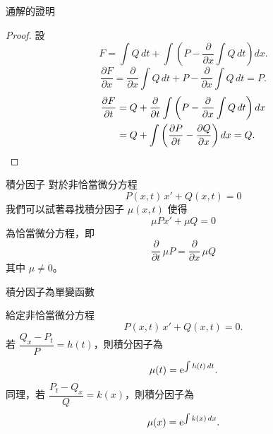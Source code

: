 \documentclass{beamer}
\newcommand  {\e}{\textup e}
\theoremstyle{remark}
\begin{document}
\begin{CJK}{UTF8}{bsmi}

\begin{frame}{通解的證明}
  \begin{proof}
    設
    \[F = \int Q\,dt + \int \left( P - \frac{\partial}{\partial x} \int Q\,dt \right) dx.\]
    \[\frac{\partial F}{\partial x} = \frac{\partial}{\partial x} \int Q\,dt + P - \frac{\partial}{\partial x} \int Q\,dt
      = P.\]
    \begin{align*}
      \frac{\partial F}{\partial t}
	&= Q + \frac{\partial}{\partial t} \int \left( P - \frac{\partial}{\partial x} \int Q\,dt \right) dx\\
	&= Q + \int \left( \frac{\partial P}{\partial t} - \frac{\partial Q}{\partial x} \right) dx = Q. \qedhere
    \end{align*}
  \end{proof}
\end{frame}

\begin{frame}{積分因子}
  對於非恰當微分方程
  \[P(x,t)\,x' + Q(x,t) = 0\]
  我們可以試著尋找積分因子 $\mu(x,t)$ 使得
  \[\mu Px' + \mu Q = 0\]
  為恰當微分方程，即
  \begin{equation}
    \frac{\partial}{\partial t}\,\mu P = \frac{\partial}{\partial x}\,\mu Q \label{eq:Multiplier}
  \end{equation}
  其中 $\mu \ne 0$。
\end{frame}

\begin{frame}{積分因子為單變函數}
  \begin{theorem}
    給定非恰當微分方程
    \begin{equation}
      P(x,t)\,x' + Q(x,t) = 0. \label{eq:NonExact}
    \end{equation}
    若 $\dfrac{Q_x - P_t}{P} = h(t)$，則積分因子為
    \begin{equation}
      \mu(t) = \e^{\int h(t)\,dt}. \label{eq:xMultiplier}
    \end{equation}
    同理，若 $\dfrac{P_t - Q_x}{Q} = k(x)$，則積分因子為
    \[\mu(x) = \e^{\int k(x)\,dx}.\]
  \end{theorem}
\end{frame}


\end{CJK}
\end{document}
